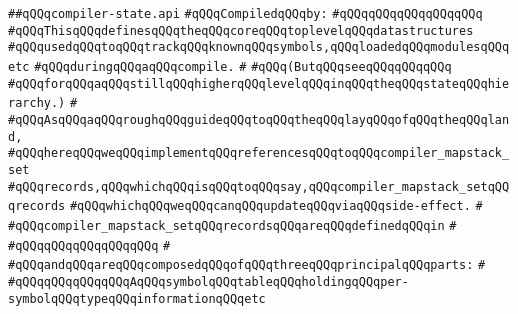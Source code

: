 \label{src/lib/compiler/toplevel/interact/compiler-state.api}
\verb|##qQQqcompiler-state.api|\newline
\newline
\verb|#qQQqCompiledqQQqby:|\newline
\verb|#qQQqqQQqqQQqqQQqqQQq|\newline
\newline
\newline
\newline
\verb|#qQQqThisqQQqdefinesqQQqtheqQQqcoreqQQqtoplevelqQQqdatastructures|\newline
\verb|#qQQqusedqQQqtoqQQqtrackqQQqknownqQQqsymbols,qQQqloadedqQQqmodulesqQQqetc|\newline
\verb|#qQQqduringqQQqaqQQqcompile.|\newline
\verb|#|\newline
\verb|#qQQq(ButqQQqseeqQQqqQQqqQQq|\newline
\verb|#qQQqforqQQqaqQQqstillqQQqhigherqQQqlevelqQQqinqQQqtheqQQqstateqQQqhierarchy.)|\newline
\verb|#|\newline
\verb|#qQQqAsqQQqaqQQqroughqQQqguideqQQqtoqQQqtheqQQqlayqQQqofqQQqtheqQQqland,|\newline
\verb|#qQQqhereqQQqweqQQqimplementqQQqreferencesqQQqtoqQQqcompiler_mapstack_set|\newline
\verb|#qQQqrecords,qQQqwhichqQQqisqQQqtoqQQqsay,qQQqcompiler_mapstack_setqQQqrecords|\newline
\verb|#qQQqwhichqQQqweqQQqcanqQQqupdateqQQqviaqQQqside-effect.|\newline
\verb|#|\newline
\verb|#qQQqcompiler_mapstack_setqQQqrecordsqQQqareqQQqdefinedqQQqin|\newline
\verb|#|\newline
\verb|#qQQqqQQqqQQqqQQqqQQq|\newline
\verb|#|\newline
\verb|#qQQqandqQQqareqQQqcomposedqQQqofqQQqthreeqQQqprincipalqQQqparts:|\newline
\verb|#|\newline
\verb|#qQQqqQQqqQQqqQQqAqQQqsymbolqQQqtableqQQqholdingqQQqper-symbolqQQqtypeqQQqinformationqQQqetc|\newline
